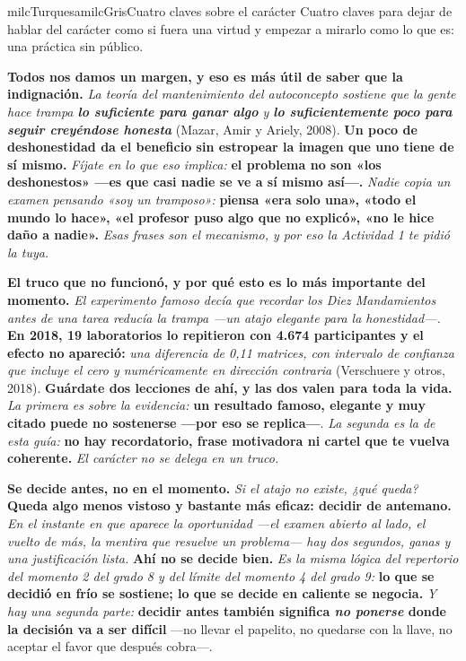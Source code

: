 \documentclass[11pt,letterpaper]{article}
\newcommand{\milcpaso}[3]{%
\Needspace{4\baselineskip}%
\begin{tcolorbox}[enhanced,colback=white,colframe=milcLinea,arc=1.5mm,boxrule=.9pt,
  left=14mm,right=4mm,top=3mm,bottom=3mm,before skip=4pt,after skip=4pt,
  fontupper=\RaggedRight,
  overlay={\node[anchor=north west,circle,fill=#2,text=white,inner sep=0pt,
    minimum size=7.4mm,font=\sffamily\bfseries\small]
    at ([xshift=3.6mm,yshift=-3.2mm]frame.north west) {#1};}]
#3
\end{tcolorbox}}
\begin{document}
\begin{softbox}{milcTurquesa}{milcGris}{Cuatro claves sobre el carácter}
Cuatro claves para dejar de hablar del carácter como si fuera una virtud y empezar a mirarlo como lo que es: una práctica sin público.
\end{softbox}

\milcpaso{1}{milcTurquesa}{\textbf{Todos nos damos un margen, y eso es más útil de saber que la indignación.} \emph{La teoría del mantenimiento del autoconcepto sostiene que la gente hace trampa \textbf{lo suficiente para ganar algo} y \textbf{lo suficientemente poco para seguir creyéndose honesta}} (Mazar, Amir y Ariely, 2008). \textbf{Un poco de deshonestidad da el beneficio sin estropear la imagen que uno tiene de sí mismo.} \emph{Fíjate en lo que eso implica:} \textbf{el problema no son «los deshonestos» ---es que casi nadie se ve a sí mismo así---.} \emph{Nadie copia un examen pensando «soy un tramposo»:} \textbf{piensa «era solo una», «todo el mundo lo hace», «el profesor puso algo que no explicó», «no le hice daño a nadie».} \emph{Esas frases son el mecanismo, y por eso la Actividad 1 te pidió la tuya.}}
\milcpaso{2}{milcTurquesa}{\textbf{El truco que no funcionó, y por qué esto es lo más importante del momento.} \emph{El experimento famoso decía que recordar los Diez Mandamientos antes de una tarea reducía la trampa ---un atajo elegante para la honestidad---.} \textbf{En 2018, 19 laboratorios lo repitieron con 4.674 participantes y el efecto no apareció:} \emph{una diferencia de 0,11 matrices, con intervalo de confianza que incluye el cero y numéricamente en dirección contraria} (Verschuere y otros, 2018). \textbf{Guárdate dos lecciones de ahí, y las dos valen para toda la vida.} \emph{La primera es sobre la evidencia:} \textbf{un resultado famoso, elegante y muy citado puede no sostenerse ---por eso se replica---}. \emph{La segunda es la de esta guía:} \textbf{no hay recordatorio, frase motivadora ni cartel que te vuelva coherente.} \emph{El carácter no se delega en un truco.}}
\milcpaso{3}{milcTurquesa}{\textbf{Se decide antes, no en el momento.} \emph{Si el atajo no existe, ¿qué queda?} \textbf{Queda algo menos vistoso y bastante más eficaz: decidir de antemano.} \emph{En el instante en que aparece la oportunidad ---el examen abierto al lado, el vuelto de más, la mentira que resuelve un problema--- hay dos segundos, ganas y una justificación lista.} \textbf{Ahí no se decide bien.} \emph{Es la misma lógica del repertorio del momento 2 del grado 8 y del límite del momento 4 del grado 9:} \textbf{lo que se decidió en frío se sostiene; lo que se decide en caliente se negocia.} \emph{Y hay una segunda parte:} \textbf{decidir antes también significa \emph{no ponerse} donde la decisión va a ser difícil} ---no llevar el papelito, no quedarse con la llave, no aceptar el favor que después cobra---.}
\end{document}
